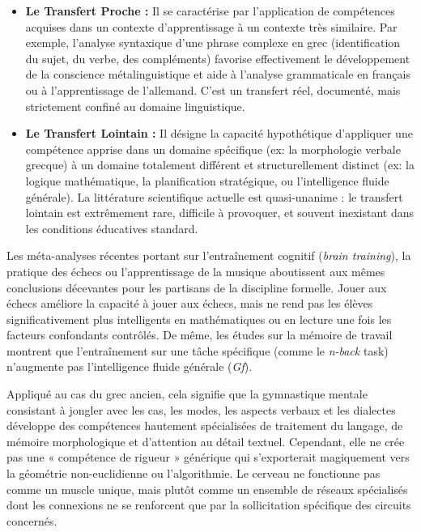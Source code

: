 \begin{itemize}\item \textbf{Le Transfert Proche :} Il se caractérise par l'application de compétences acquises dans un contexte d'apprentissage à un contexte très similaire. Par exemple, l'analyse syntaxique d'une phrase complexe en grec (identification du sujet, du verbe, des compléments) favorise effectivement le développement de la conscience métalinguistique et aide à l'analyse grammaticale en français ou à l'apprentissage de l'allemand.\cite{II-1-2-ref17} C'est un transfert réel, documenté, mais strictement confiné au domaine linguistique.\item \textbf{Le Transfert Lointain :} Il désigne la capacité hypothétique d'appliquer une compétence apprise dans un domaine spécifique (ex: la morphologie verbale grecque) à un domaine totalement différent et structurellement distinct (ex: la logique mathématique, la planification stratégique, ou l'intelligence fluide générale). La littérature scientifique actuelle est quasi-unanime : le transfert lointain est extrêmement rare, difficile à provoquer, et souvent inexistant dans les conditions éducatives standard.\cite{II-1-2-ref7}\end{itemize}Les méta-analyses récentes portant sur l'entraînement cognitif (\textit{brain training}), la
pratique des échecs ou l'apprentissage de la musique aboutissent aux mêmes conclusions décevantes
pour les partisans de la discipline formelle. Jouer aux échecs améliore la capacité à jouer aux
échecs, mais ne rend pas les élèves significativement plus intelligents en mathématiques ou en
lecture une fois les facteurs confondants contrôlés.\cite{II-1-2-ref8} De même, les études sur la
mémoire de travail montrent que l'entraînement sur une tâche spécifique (comme le \textit{n-back}
task) n'augmente pas l'intelligence fluide générale (\textit{Gf}).\cite{II-1-2-ref21}

Appliqué au cas du grec ancien, cela signifie que la gymnastique mentale consistant à jongler avec
les cas, les modes, les aspects verbaux et les dialectes développe des compétences hautement
spécialisées de traitement du langage, de mémoire morphologique et d'attention au détail textuel.
Cependant, elle ne crée pas une « compétence de rigueur » générique qui s'exporterait magiquement
vers la géométrie non-euclidienne ou l'algorithmie.\cite{II-1-2-ref22} Le cerveau ne fonctionne pas
comme un muscle unique, mais plutôt comme un ensemble de réseaux spécialisés dont les connexions ne
se renforcent que par la sollicitation spécifique des circuits concernés.



